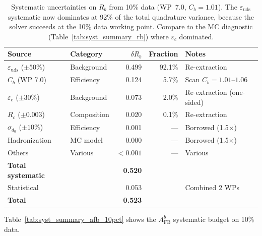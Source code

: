\documentclass[11pt,a4paper]{article}
\begin{document}
\begin{table}[htbp]
\centering
\caption{Systematic uncertainties on $R_b$ from 10\% data (WP~7.0, $C_b = 1.01$).
The $\varepsilon_\mathrm{uds}$ systematic now dominates at 92\% of the total quadrature variance,
because the solver succeeds at the 10\% data working point. Compare to the MC diagnostic
(Table~\ref{tab:syst_summary_rb}) where $\varepsilon_c$ dominated.}
\label{tab:syst_summary_rb_10pct}
\small
\begin{tabular}{llrrl}
\toprule
Source & Category & $\delta R_b$ & Fraction & Notes \\
\midrule
$\varepsilon_\mathrm{uds}$ ($\pm 50\%$) & Background & 0.499 & 92.1\% & Re-extraction \\
$C_b$ (WP 7.0) & Efficiency & 0.124 & 5.7\% & Scan $C_b = 1.01$--$1.06$ \\
$\varepsilon_c$ ($\pm 30\%$) & Background & 0.073 & 2.0\% & Re-extraction (one-sided) \\
$R_c$ ($\pm 0.003$) & Composition & 0.020 & 0.1\% & Re-extraction \\
$\sigma_{d_0}$ ($\pm 10\%$) & Efficiency & 0.001 & --- & Borrowed (1.5$\times$) \\
Hadronization & MC model & 0.000 & --- & Borrowed (1.5$\times$) \\
Others & Various & $< 0.001$ & --- & Various \\
\midrule
\textbf{Total systematic} & & \textbf{0.520} & & \\
Statistical & & 0.053 & & Combined 2 WPs \\
\midrule
\textbf{Total} & & \textbf{0.523} & & \\
\bottomrule
\end{tabular}
\end{table}

Table~\ref{tab:syst_summary_afb_10pct} shows the $A_\mathrm{FB}^b$ systematic budget
on 10\% data.
\end{document}

